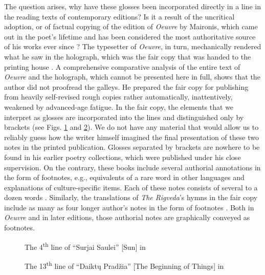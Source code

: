 \begin{paper}
The question arises, why have these glosses been incorporated directly in a line in the
reading texts of contemporary editions? Is it a
result of the uncritical adoption, or of factual copying of the edition of
\emph{Oeuvre} by Maironis, which came out in the poet's lifetime and has
been considered the most authoritative source of his works ever since \citep[182 and 187]{maironis_maironio_1927}? The typesetter of
\emph{Oeuvre}, in turn, mechanically rendered what he saw in the holograph, which was the
fair copy that was handed to the printing house \citep[227r and 233r]{maironis_vertimai_1927}. A comprehensive comparative analysis of the entire text of
\emph{Oeuvre} and the holograph, which cannot be presented here in full,
shows that the author did not proofread the galleys. He prepared the
fair copy for publishing from heavily self-revised rough copies rather
automatically, inattentively, weakened by advanced-age fatigue. In the
fair copy, the elements that we interpret as glosses are incorporated
into the lines and distinguished only by brackets (see Figs. \ref{fig:subacius3} and \ref{fig:subacius4}).
We do not have any material that would allow us to reliably guess how
the writer himself imagined the final presentation of these two notes in
the printed publication. Glosses separated by brackets are nowhere to be
found in his earlier poetry collections, which were published under his
close supervision. On the contrary, these books include several
authorial annotations in the form of footnotes, e.g., equivalents of a rare
word in other languages and explanations of culture-specific items. Each
of these notes consists of several to a dozen words \citep[30,
45--46, 56--58 and 109]{maironis_pavasario_1920}. Similarly, the translations of \emph{The
Rigveda}'s hymns in the fair copy include as many as four longer
author's notes in the form of footnotes \citep[228r, 231r
twice and 233r]{maironis_vertimai_1927}. Both in \emph{Oeuvre} and in later editions, those
authorial notes are graphically conveyed as footnotes.

\begin{figure}[H]
    \centering
    \caption{The 4\textsuperscript{th} line of ``Surjai Saulei'' [Sun] in \citealt[233r]{maironis_vertimai_1927}}
    \label{fig:subacius3}
\end{figure}

\begin{figure}[H]
    \centering
    \caption{The 13\textsuperscript{th} line of ``Daiktų Pradžia'' [The Beginning of Things] in \citealt[227r]{maironis_vertimai_1927}}
    \label{fig:subacius4}
\end{figure}


\end{paper}
